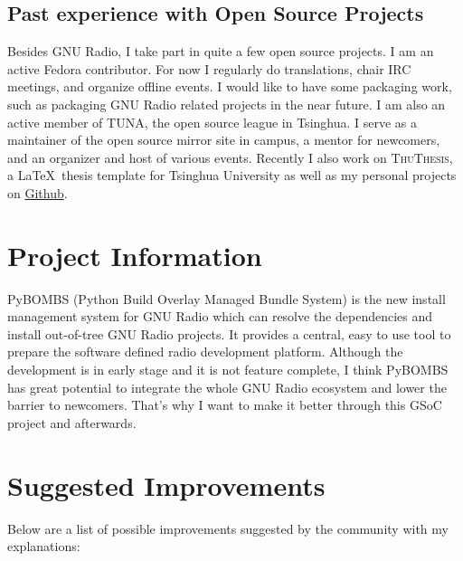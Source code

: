 \documentclass[a4paper]{article}
\begin{document}
\subsection{Past experience with Open Source Projects}

Besides GNU Radio, I take part in quite a few open source projects.  I
am an active Fedora contributor. For now I regularly do translations,
chair IRC meetings, and organize offline events.  I would like to have
some packaging work, such as packaging GNU Radio related projects in the
near future. I am also an active member of TUNA, the open source league
in Tsinghua. I serve as a maintainer of the open source mirror site in
campus, a mentor for newcomers, and an organizer and host of various
events. Recently I also work on \textsc{ThuThesis}, a \LaTeX\ thesis template
for Tsinghua University as well as my personal projects on
\href{https://github.com/alick9188}{Github}.

\section{Project Information}

PyBOMBS (Python Build Overlay Managed Bundle System) is the new install
management system for GNU Radio which can resolve the dependencies and
install out-of-tree GNU Radio projects. It provides a central, easy to
use tool to prepare the software defined radio development platform.
Although the development is in early stage and it is not feature
complete, I think PyBOMBS has great potential to integrate the whole GNU
Radio ecosystem and lower the barrier to newcomers. That's why I want to
make it better through this GSoC project and afterwards.

\section{Suggested Improvements}

Below are a list of possible improvements suggested by the community
with my explanations:
\end{document}
